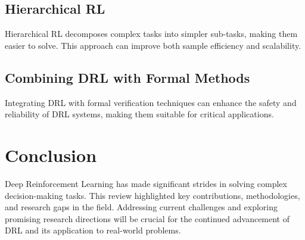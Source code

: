 \documentclass{article}
\begin{document}
\subsection{Hierarchical RL}
Hierarchical RL decomposes complex tasks into simpler sub-tasks, making them easier to solve. This approach can improve both sample efficiency and scalability.

\subsection{Combining DRL with Formal Methods}
Integrating DRL with formal verification techniques can enhance the safety and reliability of DRL systems, making them suitable for critical applications.

\section{Conclusion}
Deep Reinforcement Learning has made significant strides in solving complex decision-making tasks. This review highlighted key contributions, methodologies, and research gaps in the field. Addressing current challenges and exploring promising research directions will be crucial for the continued advancement of DRL and its application to real-world problems.



\end{document}
